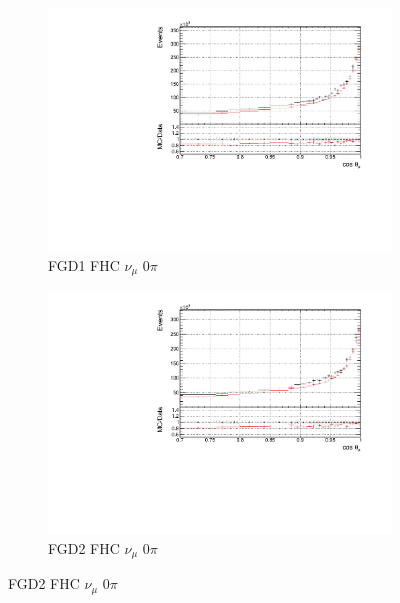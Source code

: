 \begin{figure}[!h]
\begin{subfigure}{0.49\textwidth}
  \centering
  \includegraphics[width=\textwidth]{figs/prioronly1D_t_FGD1_numuCC_0pi}
  \caption{FGD1 FHC $\nu_{\mu}$ 0$\pi$}
\end{subfigure}
\begin{subfigure}{0.49\textwidth}
  \centering
  \includegraphics[width=\textwidth]{figs/prioronly1D_t_FGD2_numuCC_0pi}
  \caption{FGD2 FHC $\nu_{\mu}$ 0$\pi$}
\end{subfigure}


\end{figure}

